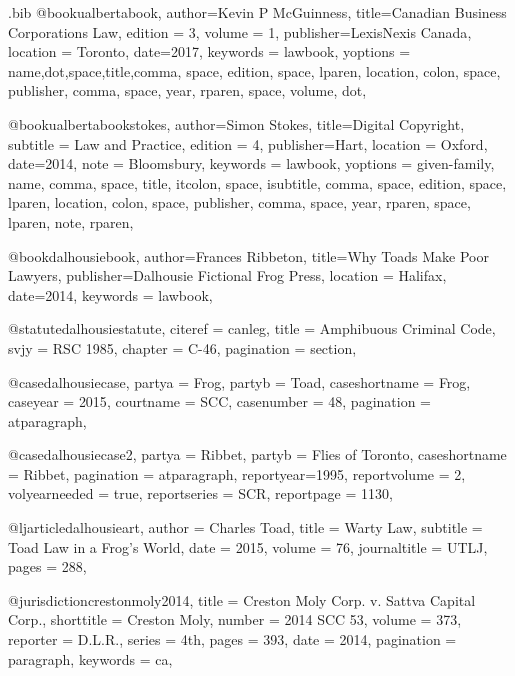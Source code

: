 \begin{filecontents*}[overwrite]{\jobname.bib}
@book{ualbertabook,
author={Kevin P McGuinness},
title={Canadian Business Corporations Law},
edition = {3},
volume = {1},
publisher={LexisNexis Canada},
location = {Toronto},
date={2017},
keywords = {lawbook},
yoptions = {name,dot,space,title,comma,
space,
edition,
space,
lparen, 
location,
colon,
space,
publisher,
comma,
space,
year,
rparen,
space,
volume,
dot},
}



@book{ualbertabookstokes,
author={Simon Stokes},
title={Digital Copyright},
subtitle = {Law and Practice},
edition = {4},
publisher={Hart},
location = {Oxford},
date={2014},
note = {Bloomsbury},
keywords = {lawbook},
yoptions = {given-family,
name,
comma,
space,
title,
itcolon,
space,
isubtitle,
comma,
space,
edition,
space,
lparen, 
location,
colon,
space,
publisher,
comma,
space,
year,
rparen,
space,
lparen,
note,
rparen},
}




@book{dalhousiebook,
author={Frances Ribbeton},
title={Why Toads Make Poor Lawyers},
publisher={Dalhousie Fictional Frog Press},
location = {Halifax},
date={2014},
keywords = {lawbook},
}

@statute{dalhousiestatute,
citeref = {canleg},
title = {Amphibuous Criminal Code},
svjy = {RSC 1985},
chapter = {C-46},
pagination = {section},
}

@case{dalhousiecase,
  partya = {Frog}, 
  partyb = {Toad},
  caseshortname = {Frog},
  caseyear = {2015},
  courtname = {SCC},
  casenumber = {48},
  pagination = {atparagraph},
	}

@case{dalhousiecase2,
  partya = {Ribbet}, 
  partyb = {Flies of Toronto},
  caseshortname = {Ribbet},
  pagination = {atparagraph},
  reportyear={1995},
  reportvolume = {2},
  volyearneeded = {true},
  reportseries = {SCR},
  reportpage = {1130},
	}


@ljarticle{dalhousieart,
author = {Charles Toad},
title = {Warty Law},
subtitle = {Toad Law in a Frog's World},
date = {2015},
volume = {76},
journaltitle = {UTLJ},
pages = {288},
}



@jurisdiction{crestonmoly2014,
title = {Creston Moly Corp. v. Sattva Capital Corp.},
shorttitle = {Creston Moly},
number = {2014 SCC 53},
volume = {373},
reporter = {D.L.R.},
series = {4th},
pages = {393},
date = {2014},
pagination = {paragraph},
keywords = {ca},
}


\end{filecontents*}
